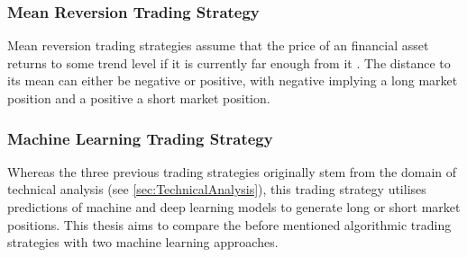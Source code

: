 \subsubsection{Mean Reversion Trading Strategy}
\label{subsub:Mean_Reversion}
Mean reversion trading strategies assume that the price of an financial asset returns to some trend level if it is currently far enough from it \citep{balvers2000mean}. The distance to its mean can either be negative or positive, with negative implying a long market position and a positive a short market position.

\subsubsection{Machine Learning Trading Strategy}
\label{subsub:ML_Strategy}
Whereas the three previous trading strategies originally stem from the domain of technical analysis (see \ref{sec:TechnicalAnalysis}), this trading strategy utilises predictions of machine and deep learning models to generate long or short market positions. This thesis aims to compare the before mentioned algorithmic trading strategies with two machine learning approaches.
